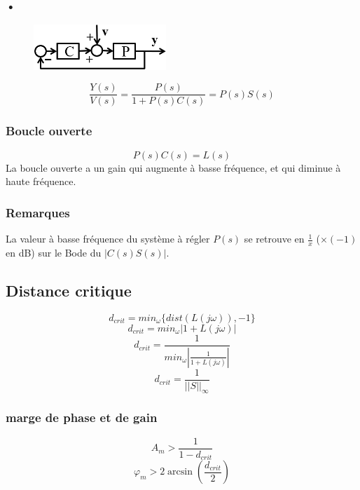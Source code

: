 \documentclass[resume]{subfiles}
\begin{document}
\subsubsection{•}
\begin{figure}[H]
\centering
\includegraphics[width=5.00cm]{img_11.png}
\end{figure}
$$\frac{Y(s)}{V(s)}=\frac{P(s)}{1+P(s)C(s)}=P(s)S(s)$$
\subsubsection{Boucle ouverte}
$$P(s)C(s)=L(s)$$
La boucle ouverte a un gain qui augmente à basse fréquence, et qui diminue à haute fréquence.
\subsubsection{Remarques}
La valeur à basse fréquence du système à régler $P(s)$ se retrouve en $\frac{1}{x}$ ($\times (-1)$ en dB) sur le Bode du $|C(s)S(s)|$.

\subsection{Distance critique}

$$d_{crit} = min_{\omega}\{dist(L(j\omega)), -1\}$$
$$d_{crit} = min_{\omega}|1+L(j\omega)|$$
$$d_{crit} = \frac{1}{min_{\omega}|\frac{1}{1+L(j\omega)}|}$$
$$d_{crit} = \frac{1}{||S||_\infty}$$

\subsubsection{marge de phase et de gain}
$$A_m > \frac{1}{1-d_{crit}}$$
$$\varphi_m > 2\arcsin(\frac{d_{crit}}{2})$$
\end{document}
